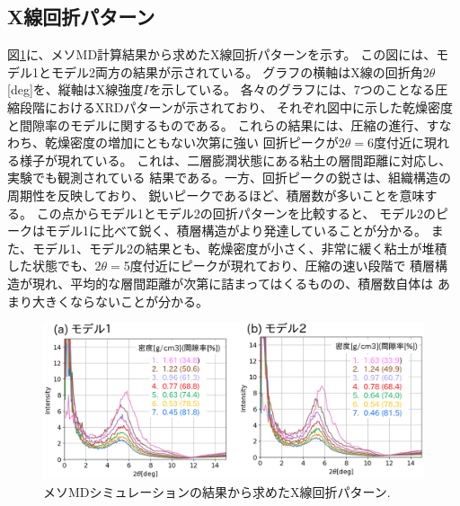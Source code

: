 \subsection{X線回折パターン}
図\ref{fig:fig6}に、メソMD計算結果から求めたX線回折パターンを示す。
この図には、モデル1とモデル2両方の結果が示されている。
グラフの横軸はX線の回折角$2\theta$[deg]を、縦軸はX線強度$I$を示している。
各々のグラフには、7つのことなる圧縮段階におけるXRDパターンが示されており、
それぞれ図中に示した乾燥密度と間隙率のモデルに関するものである。
これらの結果には、圧縮の進行、すなわち、乾燥密度の増加にともない次第に強い
回折ピークが$2\theta=$6度付近に現れる様子が現れている。
これは、二層膨潤状態にある粘土の層間距離に対応し、実験でも観測されている
結果である。一方、回折ピークの鋭さは、組織構造の周期性を反映しており、
鋭いピークであるほど、積層数が多いことを意味する。
この点からモデル1とモデル2の回折パターンを比較すると、
モデル2のピークはモデル1に比べて鋭く、積層構造がより発達していることが分かる。
また、モデル1、モデル2の結果とも、乾燥密度が小さく、非常に緩く粘土が堆積
した状態でも、$2\theta=$5度付近にピークが現れており、圧縮の速い段階で
積層構造が現れ、平均的な層間距離が次第に詰まってはくるものの、積層数自体は
あまり大きくならないことが分かる。
\begin{figure}[h]
	\begin{center}
	\includegraphics[width=1.0\linewidth]{Figs/fig6.eps} 
	\end{center}
	\caption{
		メソMDシミュレーションの結果から求めたX線回折パターン.
	} 
	\label{fig:fig6}
\end{figure}
